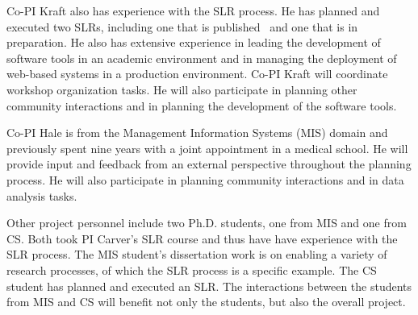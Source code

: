 Co-PI Kraft also has experience with the SLR process. He has planned and executed two SLRs, including one that is published~\cite{JeremyRPate_et_al_2011} and one that is in preparation.  He also has extensive experience in leading the development of software tools in an academic environment and in managing the deployment of web-based systems in a production environment. Co-PI Kraft will coordinate workshop organization tasks. He will also participate in planning other community interactions and in planning the development of the software tools.

Co-PI Hale is from the Management Information Systems (MIS) domain and previously spent nine years with a joint appointment in a medical school.
He will provide input and feedback from an external perspective throughout the planning process.
He will also participate in planning community interactions and in data analysis tasks.

Other project personnel include two Ph.D. students, one from MIS and one from CS.
Both took PI Carver's SLR course and thus have have experience with the SLR process.
The MIS student's dissertation work is on enabling a variety of research processes, of which the SLR process is a specific example.
The CS student has planned and executed an SLR.
The interactions between the students from MIS and CS will benefit not only the students, but also the overall project.



